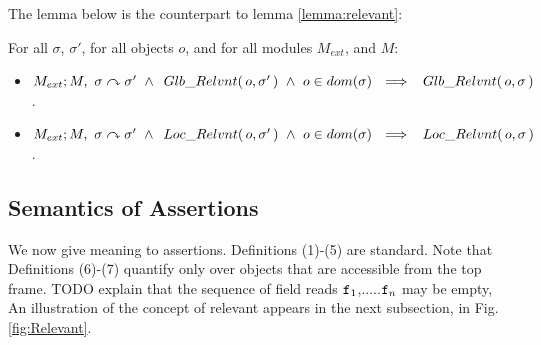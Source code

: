 \subsubsection{}


The lemma below is the counterpart to lemma \ref{lemma:relevant}:

\begin{lemma}
For all $\sigma$, $\sigma'$, for all objects $o$, and for all modules $M_{ext}$, and $M$:
\begin{itemize}
\item
$M_{ext} ; M,\ \sigma \curvearrowright \sigma' \ \wedge \  \,Glb\_Relvnt(\,o,\sigma'\,) \ \wedge \ o\in dom(\sigma) \ \ \Longrightarrow \ \  \,Glb\_Relvnt(\,o,\sigma\,)$.
\item
$M_{ext} ; M,\ \sigma \curvearrowright \sigma' \ \wedge \    \,Loc\_Relvnt(\,o,\sigma'\,)\   \wedge \ o\in dom(\sigma) \ \ \Longrightarrow \ \  \,Loc\_Relvnt(\,o,\sigma\,)$.
\end{itemize}
\end{lemma}

\subsection{Semantics of Assertions}

We now give meaning to assertions. Definitions (1)-(5) are standard. Note that Definitions (6)-(7) quantify only over objects that are accessible from the top frame. TODO  explain that the sequence of field reads ${\texttt{f}}_1$,.....${\texttt{f}}_n$ may be empty,
An illustration of the concept of relevant appears in the next subsection, in Fig. \ref{fig:Relevant}.

%
%


